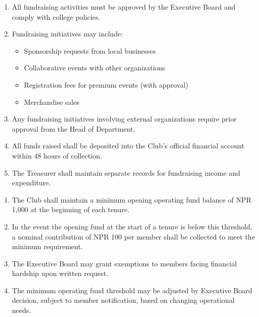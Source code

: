 \begin{enumerate}[label=\alph*), leftmargin=2em, itemsep=0.3em]
    \item All fundraising activities must be approved by the Executive Board and comply with college policies.
    \item Fundraising initiatives may include:
    \begin{itemize}[leftmargin=1.5em, itemsep=0.2em]
        \item Sponsorship requests from local businesses
        \item Collaborative events with other organizations
        \item Registration fees for premium events (with approval)
        \item Merchandise sales
    \end{itemize}
    \item Any fundraising initiatives involving external organizations require prior approval from the Head of Department.
    \item All funds raised shall be deposited into the Club's official financial account within 48 hours of collection.
    \item The Treasurer shall maintain separate records for fundraising income and expenditure.
\end{enumerate}


\begin{enumerate}[label=\alph*), leftmargin=2em, itemsep=0.3em]
    \item The Club shall maintain a minimum opening operating fund balance of NPR 1,000 at the beginning of each tenure.
    \item In the event the opening fund at the start of a tenure is below this threshold, a nominal contribution of NPR 100 per member shall be collected to meet the minimum requirement.
    \item The Executive Board may grant exemptions to members facing financial hardship upon written request.
    \item The minimum operating fund threshold may be adjusted by Executive Board decision, subject to member notification, based on changing operational needs.
\end{enumerate}


